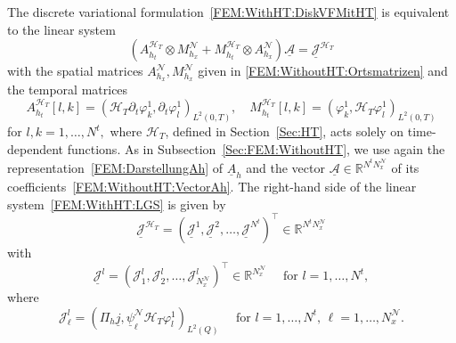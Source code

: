 \documentclass[a4paper,11pt]{article}
\newcommand{\R}{\mathbb R}
\newcommand{\vecA}{\vec{\mathcal A}}
\renewcommand{\vec}[1]{\underline{#1}}
\begin{document}
The discrete variational formulation~\eqref{FEM:WithHT:DiskVFMitHT} is equivalent to the linear system
\begin{equation} \label{FEM:WithHT:LGS}
	(A_{h_t}^{\mathcal H_T} \otimes M_{h_x}^{\mathcal{N}} +  M_{h_t}^{\mathcal H_T} \otimes A_{h_x}^{\mathcal{N}}) \vec{ \mathcal A }= \vec{\mathcal J}^{\mathcal H_T}
\end{equation}
with the spatial matrices $A_{h_x}^{\mathcal{N}}, M_{h_x}^{\mathcal{N}}$ given in \eqref{FEM:WithoutHT:Ortsmatrizen} and
the temporal matrices
\begin{equation} \label{FEM:WithHT:TimeMatrices}
	A_{h_t}^{\mathcal H_T}[l,k] = (\mathcal H_T \partial_t \varphi^1_k, \partial_t \varphi^1_l)_{L^2(0,T)}, \quad M_{h_t}^{\mathcal H_T}[l,k] = (\varphi^1_k, \mathcal H_T \varphi^1_l)_{L^2(0,T)}
\end{equation}
for $l,k=1,\dots,N^t,$ where $\mathcal H_T$, defined in Section~\ref{Sec:HT}, acts solely on time-dependent functions. As in Subsection~\ref{Sec:FEM:WithoutHT}, we use again the representation~\eqref{FEM:DarstellungAh} of $\vec A_h$ and the vector $\vecA \in \R^{N^t N_x^{\mathcal{N}}}$ of its coefficients~\eqref{FEM:WithoutHT:VectorAh}. The right-hand side of the linear system~\eqref{FEM:WithHT:LGS} is given by
\begin{equation*}
	\vec{\mathcal J}^{\mathcal H_T} = ( \vec{\mathcal J}^1, \vec{\mathcal J}^2, \dots, \vec{\mathcal J}^{N^t} )^\top \in \R^{N^t N_x^{\mathcal{N}}}
\end{equation*}
with
\begin{equation*}
	\vec{\mathcal J}^l = ({\mathcal J}_1^l, {\mathcal J}_2^l, \dots, {\mathcal J}_{N_x^{\mathcal{N}}}^l)^\top \in \R^{N_x^{\mathcal{N}}} \quad \text{ for } l = 1,\dots, N^t,
\end{equation*}
where
\begin{equation} \label{FEM:WithHT:RechteSeite}
	{\mathcal J}_\ell^l = (\Pi_h \vec j, \vec \psi^\mathcal{N}_{\ell} \mathcal H_T \varphi^1_l)_{L^2(Q)} \quad \text{ for } l=1,\dots, N^t, \, \ell=1,\dots,N_x^{\mathcal{N}}.
\end{equation}
\end{document}
